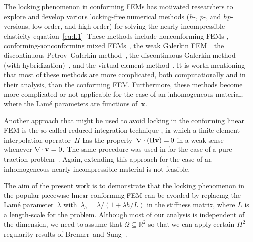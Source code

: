 \documentclass[11pt]{article}
\newcommand{\vv}{{\bf v}}
\newcommand{\bsx}{{\boldsymbol{x}}}
\numberwithin{equation}{section}
\begin{document}
The locking phenomenon in conforming FEMs has motivated researchers to explore
and develop various  locking-free numerical methods ($h$-, $p$-, and
$hp$-versions, low-order, and high-order) for solving the nearly incompressible
elasticity equation~\eqref{eq:L1}. These methods include  nonconforming FEMs
\cite{ArnoldAwanouWinther2014,BrennerSung1992,ChenRenMao2010,Falk1991,
LeeLeeSheen2003,MaoChen2008,YangChen2010}, conforming-nonconforming mixed
FEMs~\cite{BoffiBrezziFortin2013,
GopalakrishnanGuzman2011,HuShi2008,ZhangZhaoChenYang2018}, the weak Galerkin
FEM~\cite{ChenXie2016,
HuoWangWangZhang2020,HuoWangWangZhang2023,LiuWang2022,WangWangWangZhang2016},
the discontinuous Petrov--Galerkin
method~\cite{BramwellDemkowiczGopalakrishnanQiu2012}, the discontinuous Galerkin
method (with hybridization)~\cite{CockburnSchotzauWang2006,DiPietroNicaise2013,
HansboLarson2002,SoonCockburnStolarski2009,Wihler2006}, and the virtual element
 method~\cite{EdoardoStefanoCarloLuca2020,HuangLinYu2022,VeigaBrezziMarini2013,
ZhangZhaoYangChen2019,ZhaoWangZhang2022}.  It is worth mentioning that most of
these methods are more complicated, both computationally and in their analysis,
than the conforming FEM. Furthermore, these methods become more complicated or
not applicable for the case of an inhomogeneous material, where the Lam\'e
parameters are functions of~$\bsx$.

{\color{red}  Another approach that might be used to avoid locking in the
conforming linear FEM is the so-called reduced integration technique
\cite{HughesCohenHaroun1978,MalkusHughes1978}, in which a finite element
interpolation operator~$\Pi$ has the property~$\nabla\cdot(\Pi \vv)=0$ in
a weak sense whenever $\nabla\cdot\vv=0$.  The same procedure was used in
for the case of a pure traction problem~\cite{BrennerSung1992}. Again,
extending this approach for the case of an inhomogeneous nearly incompressible
material is not feasible.}

The aim of the present work is to demonstrate that the locking phenomenon in
the popular piecewise linear conforming FEM can be avoided by replacing
the Lam\'e parameter~$\lambda$ with~$\lambda_h=\lambda/(1+\lambda h/L)$ in the
stiffness matrix, where $L$ is a length-scale for the problem.  Although most
of our analysis is independent of the dimension, we need to assume that
$\Omega\subseteq\mathbb{R}^2$ so that we can apply certain $H^2$-regularity
results of Brenner~and Sung~\cite{BrennerSung1992}.
\end{document}

